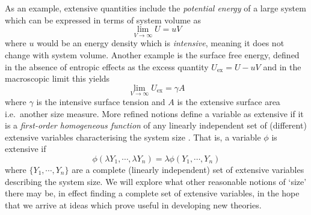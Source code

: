 As an example, extensive quantities include the \emph{potential energy} of a large system which can be expressed in terms of system volume as
\begin{equation*}
  \lim_{V \to \infty} U = u V
\end{equation*}
where $u$ would be an energy density which is \emph{intensive}, meaning it does not change with system volume.
Another example is the surface free energy, defined in the absence of entropic effects as the excess quantity $U_\mathrm{ex} = U - uV$ and in the macroscopic limit this yields
\begin{equation*}
  \lim_{V \to \infty} U_\mathrm{ex} = \gamma A
\end{equation*}
where $\gamma$ is the intensive surface tension and $A$ is the extensive surface area i.e.\ another size measure.
More refined notions define a variable as extensive if it is a \emph{first-order homogeneous function} of any linearly independent set of (different) extensive variables characterising the system size \cite{Chandler1987}.
That is, a variable $\phi$ is extensive if
\begin{equation}\label{eq:extensive-homogeneity}
  \phi(\lambda Y_1, \cdots, \lambda Y_n)
  =
  \lambda \phi(Y_1, \cdots, Y_n)
\end{equation}
where $\{Y_1, \cdots, Y_n\}$ are a complete (linearly independent) set of extensive variables describing the system size.
We will explore what other reasonable notions of `size' there may be, in effect finding a complete set of extensive variables, in the hope that we arrive at ideas which prove useful in developing new theories.

